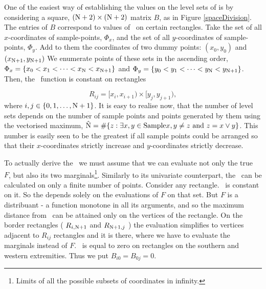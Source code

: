 One of the easiest way of establishing the values on the level sets of \Fecdf  is by considering a square, $(\mathrm{N}+2)\times(\mathrm{N}+2)$ matrix $B$, as in Figure \ref{spaceDivision}. The entries of $B$ correspond to values of \Fecdf\, on certain rectangles. Take the set of all $x$-coordinates of sample-points, $\Phi_x$, and the set of all $y$-coordinates of sample-points, $\Phi_y$. Add to them the coordinates of two dummy points: $(x_0, y_0)$ and $(x_{\mathrm{N}+1}, y_{\mathrm{N}+1})$ We enumerate points of these sets in the ascending order, $\Phi_x = \{ x_0 < x_1 < \dots <x_{\mathrm{N}} < x_{\mathrm{N}+1} \}$ and $\Phi_y = \{ y_0 < y_1 < \dots <y_{\mathrm{N}} < y_{\mathrm{N}+1} \}$. Then, the \Fecdf\, function is constant on rectangles 

$$R_{ij} = [x_i, x_{i+1})\times[y_j, y_{j+1}),$$ 
where $i,j \in \{0, 1, \dots, \mathrm{N}+1 \}$. It is easy to realise now, that the number of level sets depends on the number of sample points and points generated by them using the vectorised maximum, $\hat{\mathrm{N}} = \# \{ z : \exists x,y \in \text{Sample} x,y \not=z \text{ and } z = x \vee y \}$. This number is easily seen to be the greatest if all sample points could be arranged so that their $x$-coordinates strictly increase and $y$-coordinates strictly decrease.  

To actually derive the \KS\, we must assume that we can evaluate not only the true \cdf\, $F$, but also its two marginals\footnote{Limits of all the possible subsets of coordinates in infinity.}. Similarly to its univariate counterpart, the \KS\, can be calculated on only a finite number of points. Consider any rectangle. \Fecdf\, is constant on it. So the \KS depends solely on the evaluations of $F$ on that set. But $F$ is a distribuant - a function monotone in all its arguments, and so the maximum distance from \Fecdf\, can be attained only on the vertices of the rectangle. On the border rectangles ( $R_{i,\mathrm{N}+1}$ and $R_{\mathrm{N}+1,j}$ ) the evaluation simplifies to vertices adjacent to $R_{ij}$ rectangles and it is there, where we have to evaluate the marginals instead of $F$. \Fecdf\, is equal to zero on rectangles on the southern and western extremities. Thus we put $B_{i0} = B_{0j} = 0$. 

